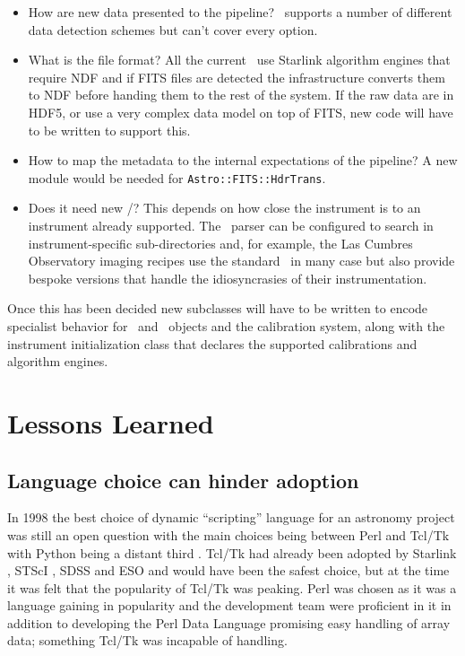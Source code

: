 \documentclass[final,authoryear,5p,times,twocolumn]{elsarticle}
\begin{document}
\begin{itemize}

\item How are new data presented to the pipeline? \oracdr\ supports a
  number of different data detection schemes but can't cover every option.

\item What is the file format? All the current \recipes\ use Starlink
  algorithm engines that require NDF \citep{ndfjenness} and if FITS
  files are detected the infrastructure converts them to NDF before
  handing them to the rest of the system. If the raw data are in HDF5,
  or use a very complex data model on top of FITS, new code will have
  to be written to support this.

\item How to map the metadata to the internal expectations of the
  pipeline? A new module would be needed for \texttt{Astro::FITS::HdrTrans}.

\item Does it need new \recipes/\primitives? This depends on how close
  the instrument is to an instrument already supported. The \recipe\
  parser can be configured to search in instrument-specific
  sub-directories and, for example, the Las Cumbres Observatory
  imaging recipes use the standard \primitives\ in many case but also
  provide bespoke versions that handle the idiosyncrasies of their
  instrumentation.

\end{itemize}

Once this has been decided new subclasses will have to be written to
encode specialist behavior for \Frame\ and \Group\ objects and the
calibration system, along with the instrument initialization class
that declares the supported calibrations and algorithm engines.

\section{Lessons Learned}

\subsection{Language choice can hinder adoption}

In 1998 the best choice of dynamic ``scripting'' language for an astronomy project was
still an open question with the main choices being between Perl and
Tcl/Tk with Python being a distant third
\citep{1995ComPh...9...57A,1999ASPC..172..494J,1999ASPC..172..483B,2000ASPC..216...91J}.
Tcl/Tk had already been adopted by Starlink
\citep{1995ASPC...77..395T}, STScI \citep{1998SPIE.3349...89D},
SDSS \citep{1996ASPC..101..248S} and ESO \citep{1996ASPC..101..396H,1995ASPC...77...58C} and
would have been the safest choice, but at the time it was felt that
the popularity of Tcl/Tk was peaking. Perl was chosen as it was a language
gaining in popularity and the development team were proficient in
it in addition to developing the Perl Data Language \citep[PDL;][]{PDL}
promising easy handling of array data; something Tcl/Tk was incapable
of handling.
\end{document}
